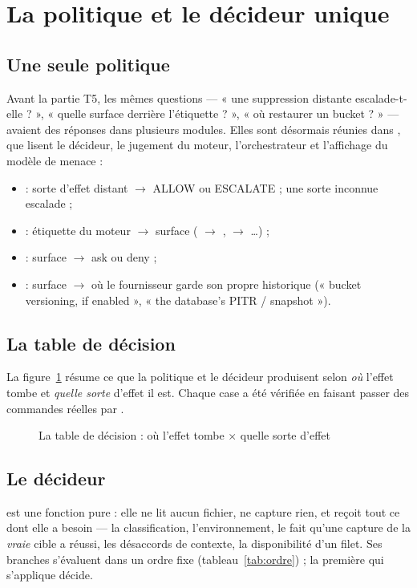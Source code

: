 \section{La politique et le décideur unique}
\label{sec:decision}

\subsection{Une seule politique}
Avant la partie T5, les mêmes questions --- « une suppression distante escalade-t-elle ? »,
« quelle surface derrière l'étiquette  ? », « où restaurer un bucket ? » ---
avaient des réponses dans plusieurs modules. Elles sont désormais réunies dans
, que lisent le décideur, le jugement du moteur, l'orchestrateur et
l'affichage du modèle de menace :
\begin{itemize}
  \item {} : sorte d'effet distant $\rightarrow$ ALLOW ou ESCALATE ; une
    sorte inconnue escalade ;
  \item {} : étiquette du moteur $\rightarrow$ surface
    ( $\rightarrow$ ,  $\rightarrow$
    \ldots) ;
  \item {} : surface $\rightarrow$ ask ou deny ;
  \item {} : surface $\rightarrow$ où le fournisseur garde son propre
    historique (« bucket versioning, if enabled », « the database's PITR / snapshot »).
\end{itemize}

\subsection{La table de décision}
La figure~\ref{fig:decision} résume ce que la politique et le décideur produisent selon
\emph{où} l'effet tombe et \emph{quelle sorte} d'effet il est. Chaque case a été vérifiée en
faisant passer des commandes réelles par .

\begin{figure}[htbp]
\centering

\caption{La table de décision : où l'effet tombe $\times$ quelle sorte d'effet}
\label{fig:decision}
\end{figure}

\subsection{Le décideur}
 est une fonction pure : elle ne lit aucun fichier, ne capture rien, et
reçoit tout ce dont elle a besoin --- la classification, l'environnement, le fait qu'une
capture de la \emph{vraie} cible a réussi, les désaccords de contexte, la disponibilité d'un
filet. Ses branches s'évaluent dans un ordre fixe (tableau~\ref{tab:ordre}) ; la première qui
s'applique décide.

